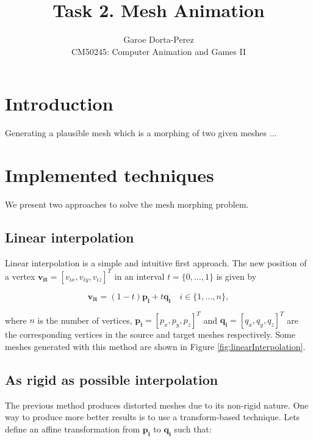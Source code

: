 \documentclass[12pt]{article}
\begin{document}
  
\title{Task 2. Mesh Animation}
\author{Garoe Dorta-Perez\\
CM50245: Computer Animation and Games II}
 
\maketitle
 
\section{Introduction}

Generating a plausible mesh which is a morphing of two given meshes ...

\section{Implemented techniques}

We present two approaches to solve the mesh morphing problem. 

\subsection{Linear interpolation}

Linear interpolation is a simple and intuitive first approach.
The new position of a vertex $\mathbf{v_{it}} = \left[ v_{ix}, v_{iy}, v_{iz}\right]^T $ in an interval $t = \lbrace 0, \ldots, 1 \rbrace$ is given by

\begin{equation*}
\mathbf{v_{it}} = (1 - t) \mathbf{p_i} + t \mathbf{q_i} \quad i \in \lbrace 1, \ldots, n \rbrace,
\end{equation*}

where $n$ is the number of vertices, $\mathbf{p_i} = \left[ p_x, p_y, p_z\right]^T$ and $\mathbf{q_i} = \left[ q_x, q_y, q_z\right]^T$ are the corresponding vertices in the source and target meshes respectively.
Some meshes generated with this method are shown in Figure \ref{fig:linearInterpolation}.

\subsection{As rigid as possible interpolation}

The previous method produces distorted meshes due to its non-rigid nature.
One way to produce more better results is to use a transform-based technique.
Lets define an affine transformation from $\mathbf{p_i}$ to $\mathbf{q_i}$ such that:
\end{document}
